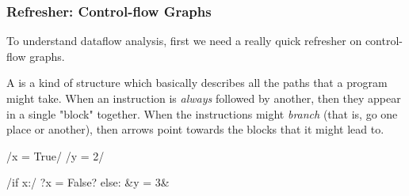 \documentclass[aspectratio=169, handout]{beamer}
\begin{document}
 \begin{frame}[fragile]
   \frametitle{Refresher: Control-flow Graphs}

   To understand dataflow analysis, first we need a really quick refresher on
   control-flow graphs.

   \pause
   \vspace{\fill}

   A  is a kind of structure which basically describes all
   the paths that a program might take. When an instruction is \textit{always}
   followed by another, then they appear in a single "block" together. When the
   instructions might \textit{branch} (that is, go one place or another), then
   arrows point towards the blocks that it might lead to.

   \pause
   \vspace{\fill}

  \begin{center}
    \begin{minipage}{0.35\textwidth}
      \begin{pythoncodeblock}
        /x = True/
        /y = 2/

        /if x:/
          ?x = False?
        else:
          &y = 3&
      \end{pythoncodeblock}
    \end{minipage}
    \pause
    \begin{minipage}{0.6\textwidth}
      \begin{center}
      \end{center}
    \end{minipage}
  \end{center}
 \end{frame}
\end{document}
